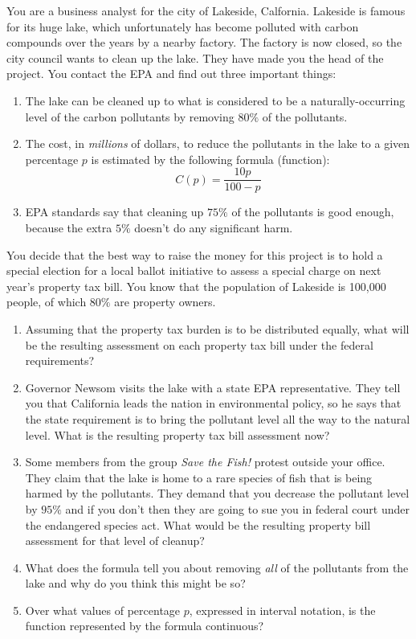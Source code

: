 \documentclass[letterpaper,12pt,fleqn]{article}
\begin{document}
You are a business analyst for the city of Lakeside, Calfornia.  Lakeside is famous for its huge lake, which unfortunately
has become polluted with carbon compounds over the years by a nearby factory.  The factory is now closed, so the city
council wants to clean up the lake.  They have made you the head of the project.  You contact the EPA and find out three
important things:
\begin{enumerate}
\item The lake can be cleaned up to what is considered to be a naturally-occurring level of the carbon pollutants
  by removing \(80\%\) of the pollutants.
\item The cost, in \emph{millions} of dollars, to reduce the pollutants in the lake to a given percentage \(p\) is estimated
  by the following formula (function):
  \[C(p)=\frac{10p}{100-p}\]
\item EPA standards say that cleaning up \(75\%\) of the pollutants is good enough, because the extra \(5\%\) doesn't do any
  significant harm.
\end{enumerate}
You decide that the best way to raise the money for this project is to hold a special election for a local ballot initiative to
assess a special charge on next year's property tax bill.  You know that the population of Lakeside is 100,000 people, of
which \(80\%\) are property owners.
\begin{enumerate}[label={(\alph*)}]
\item Assuming that the property tax burden is to be distributed equally, what will be the resulting assessment on each
  property tax bill under the federal requirements?
\item Governor Newsom visits the lake with a state EPA representative.  They tell you that California leads the nation in
  environmental policy, so he says that the state requirement is to bring the pollutant level all the way to the natural
  level.  What is the resulting property tax bill assessment now?
\item Some members from the group \emph{Save the Fish!} protest outside your office.  They claim that the lake is home to a
  rare species of fish that is being harmed by the pollutants.  They demand that you decrease the pollutant level by \(95\%\)
  and if you don't then they are going to sue you in federal court under the endangered species act.  What would be the
  resulting property bill assessment for that level of cleanup?
\item What does the formula tell you about removing \emph{all} of the pollutants from the lake and why do you think this
  might be so?
\item Over what values of percentage \(p\), expressed in interval notation, is the function represented by the formula
  continuous?
\end{enumerate}
\end{document}
